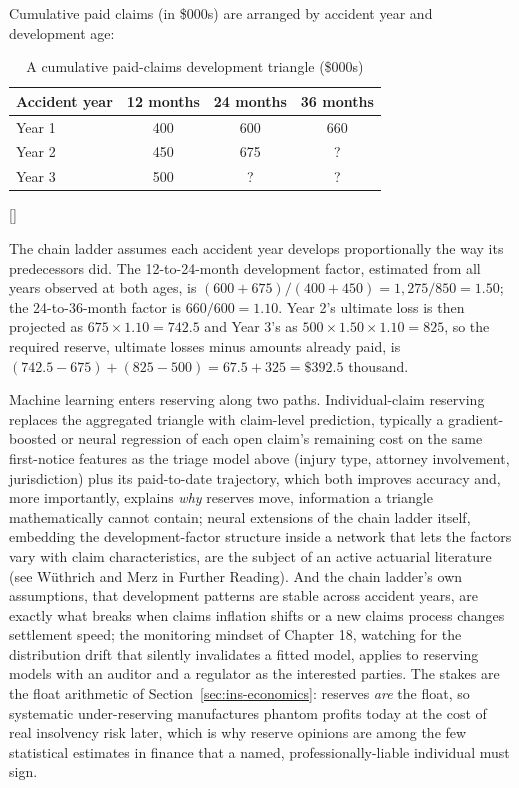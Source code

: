 \documentclass[../ai_in_finance]{subfiles}
\begin{document}
Cumulative paid claims (in \$000s) are arranged by accident year and development age:
\begin{table}[htbp]
\centering
\begin{lrbox}{\bookmeasuredbox}
\begin{tabular}{lccc}
\toprule
Accident year & 12 months & 24 months & 36 months \\
\midrule
Year 1 & 400 & 600 & 660 \\
Year 2 & 450 & 675 & ? \\
Year 3 & 500 & ? & ? \\
\bottomrule
\end{tabular}
\end{lrbox}
\ifdim\wd\bookmeasuredbox<0.65\linewidth
\setlength{\bookcapwidth}{0.65\linewidth}
\else
\setlength{\bookcapwidth}{\wd\bookmeasuredbox}
\fi
{}[\bookcapwidth]{
\usebox{\bookmeasuredbox}
}{
\caption{A cumulative paid-claims development triangle (\$000s)}
\label{tab:ins-triangle}
}
\end{table}

The chain ladder assumes each accident year develops proportionally the way its predecessors did. The 12-to-24-month development factor, estimated from all years observed at both ages, is $(600+675)/(400+450) = 1{,}275/850 = 1.50$; the 24-to-36-month factor is $660/600 = 1.10$. Year 2's ultimate loss is then projected as $675 \times 1.10 = 742.5$ and Year 3's as $500 \times 1.50 \times 1.10 = 825$, so the required reserve, ultimate losses minus amounts already paid, is $(742.5 - 675) + (825 - 500) = 67.5 + 325 = \$392.5$ thousand.

Machine learning enters reserving along two paths. Individual-claim reserving replaces the aggregated triangle with claim-level prediction, typically a gradient-boosted or neural regression of each open claim's remaining cost on the same first-notice features as the triage model above (injury type, attorney involvement, jurisdiction) plus its paid-to-date trajectory, which both improves accuracy and, more importantly, explains \emph{why} reserves move, information a triangle mathematically cannot contain; neural extensions of the chain ladder itself, embedding the development-factor structure inside a network that lets the factors vary with claim characteristics, are the subject of an active actuarial literature (see W\"uthrich and Merz in Further Reading). And the chain ladder's own assumptions, that development patterns are stable across accident years, are exactly what breaks when claims inflation shifts or a new claims process changes settlement speed; the monitoring mindset of Chapter 18, watching for the distribution drift that silently invalidates a fitted model, applies to reserving models with an auditor and a regulator as the interested parties. The stakes are the float arithmetic of Section~\ref{sec:ins-economics}: reserves \emph{are} the float, so systematic under-reserving manufactures phantom profits today at the cost of real insolvency risk later, which is why reserve opinions are among the few statistical estimates in finance that a named, professionally-liable individual must sign.
\end{document}
